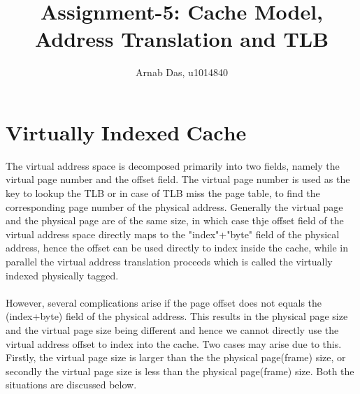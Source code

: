 \documentclass{tufte-handout}
\title{Assignment-5: Cache Model, Address Translation and TLB}
\author[]{Arnab Das, u1014840}
\begin{document}
  
  \maketitle%
  

 \setcounter{secnumdepth}{1}

\newpage

	\section{$\textbf{Virtually Indexed Cache}$}
		The virtual address space is decomposed primarily into two fields, namely the virtual page number and the offset field. The virtual page number is used as the key to lookup the TLB or in case of TLB miss the page table, to find the corresponding page number of the physical address. Generally the virtual page and the physical page are of the same size, in which case thje offset field of the virtual address space directly maps to the "index"+"byte" field of the physical address, hence the offset can be used directly to index inside the cache, while in parallel the virtual address translation proceeds which is called the virtually indexed physically tagged.
		\paragraph{} However, several complications arise if the page offset does not equals the (index+byte) field of the physical address. This results in the physical page size and the virtual page size being different and hence we cannot directly use the virtual address offset to index into the cache. Two cases may arise due to this. Firstly, the virtual page size is larger than the the physical page(frame) size, or secondly the virtual page size is less than the physical page(frame) size. Both the situations are discussed below.
\end{document}
